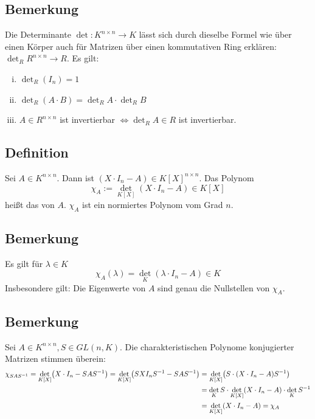 \subsection[Bemerkung zur Definition der Determinante über einem Ring]{Bemerkung} %
\label{sub:61}
Die Determinante $\det : K^{n \times n} \to K$ lässt sich durch dieselbe Formel wie über einen Körper auch für Matrizen über einen kommutativen Ring erklären:
$ \det_R R^{n \times n} \to R$. Es gilt:
\begin{enumerate}[(i)]
	\item $\det_R ( I_n) = 1$
	\item $\det_R (A \cdot B) =\det_R A \cdot \det_R B$
	\item $A \in R^{n \times n}$ ist invertierbar $\iff \det_R A \in R$ ist invertierbar. 
\end{enumerate}

\subsection[Definition charakteristisches Polynom]{Definition} %
\label{sub:62}
Sei $A \in K^{n \times n}$. Dann ist $( X \cdot I_n - A) \in K[X]^{n \times n}$. Das Polynom 
\[
	\chi_A := \det_{K[X]} (X \cdot I_n -A) \in K[X]
\]
heißt das  von $A$. $\chi_A$ ist ein normiertes Polynom vom Grad $n$. 

\subsection[Bemerkung, dass die Nullstellen mit den Eigenwerten übereinstimmen]{Bemerkung} %
\label{sub:63}
Es gilt für $\lambda \in K$
\[
	\chi_A(\lambda ) = \det_K (\lambda \cdot I_n - A) \in K
\]
Insbesondere gilt: Die Eigenwerte von $A$ sind genau die Nullstellen von $\chi_A$.

\subsection[Bemerkung über die Gleichheit der charakteristischen Polynome konjugierter Matrizen]{Bemerkung} %
\label{sub:64}
Sei $A \in K^{n \times n}, S \in GL(n,K)$. Die charakteristischen Polynome konjugierter Matrizen stimmen überein:
\begin{align*}
	\chi_{SAS ^{-1}} = \det_{K[X]} \enbrace*{X \cdot I_n - SAS ^{-1}} = \det_{K[X]} \enbrace*{S X I_n S ^{-1} - S A S ^{-1}} &= \det_{K[X]} 
	\enbrace*{S \cdot ( X \cdot I_n -A) S ^{-1}} \\
	&= \det_K S \cdot \det_{K[X]} (X \cdot I_n -A) \cdot \det_{K} S ^{-1} \\
	&= \det_{K[X]} (X \cdot  I_n -A) = \chi_A
\end{align*}

